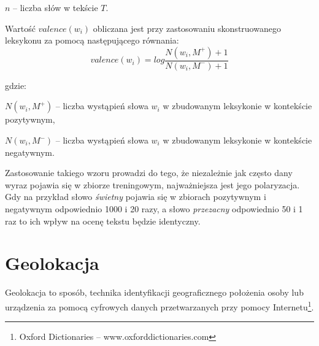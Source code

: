 $n$ -- liczba słów w tekście $T$.

\bigskip


Wartość $valence(w_i)$ obliczana jest przy zastosowaniu skonstruowanego
leksykonu za pomocą następującego równania:
\begin{equation}
valence(w_i) = log\frac{N(w_i, M^+) + 1}{N(w_i, M^-) + 1}
\end{equation} 

gdzie:

$N(w_i, M^+)$ -- liczba wystąpień słowa $w_i$ w zbudowanym leksykonie w 
kontekście pozytywnym,

$N(w_i, M^-)$ -- liczba wystąpień słowa $w_i$ w zbudowanym leksykonie w 
kontekście negatywnym.

\bigskip
Zastosowanie takiego wzoru prowadzi do tego, że niezależnie jak często
dany wyraz pojawia się w zbiorze treningowym, najważniejsza jest jego polaryzacja.
Gdy na przykład słowo \textit{świetny} pojawia się w zbiorach pozytywnym
i negatywnym odpowiednio 1000 i 20 razy, a słowo \textit{przezacny} odpowiednio
50 i 1 raz to ich wpływ na ocenę tekstu będzie identyczny.




\section{Geolokacja}
Geolokacja to sposób, technika identyfikacji geograficznego położenia osoby
lub urządzenia za pomocą cyfrowych danych przetwarzanych przy pomocy 
Internetu\footnote{Oxford Dictionaries -- www.oxforddictionaries.com}.

